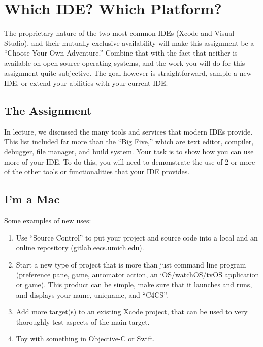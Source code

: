 \documentclass{article}
\begin{document}


\section{Which IDE? Which Platform?}

The proprietary nature of the two most common IDEs (Xcode and Visual Studio), and their mutually exclusive availability will make this assignment be a
``Choose Your Own Adventure.'' Combine that with the fact that neither is
available on open source operating systems, and the work you will do for this
assignment quite subjective. The goal however is straightforward, sample a new
IDE, or extend your abilities with your current IDE.

\subsection*{The Assignment}
In lecture, we discussed the many tools and services that modern IDEs provide.
This list included far more than the ``Big Five,'' which are text editor,
compiler, debugger, file manager, and build system. Your task is to show how
you can use more of your IDE. To do this, you will need to demonstrate the use
of 2 or more of the other tools or functionalities that your IDE provides.

\subsection{I'm a Mac}
Some examples of new uses:
\begin{enumerate}
\item Use ``Source Control'' to put your project and source code into a local
      and an online repository (gitlab.eecs.umich.edu).
\item Start a new type of project that is more than just command line program
      (preference pane, game, automator action, an iOS/watchOS/tvOS application
      or game). This product can be simple, make sure that it launches and
      runs, and displays your name, uniqname, and ``C4CS''.
\item Add more target(s) to an existing Xcode project, that can be used to very
      thoroughly test aspects of the main target.
\item Toy with something in Objective-C or Swift.
\end{enumerate}
\end{document}

